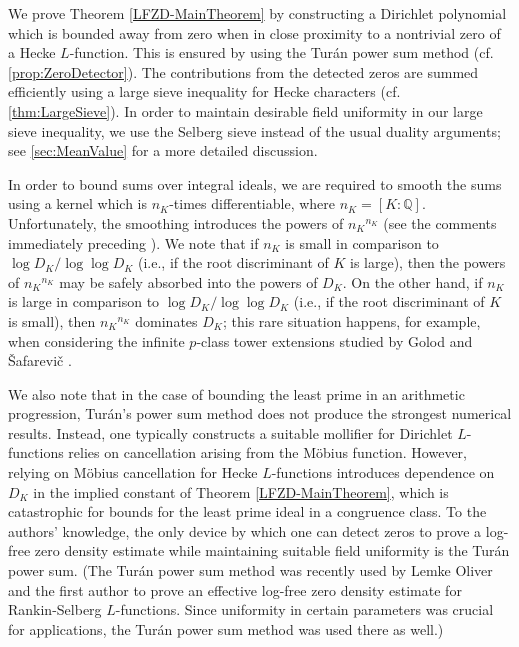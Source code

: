 \documentclass[12pt,psamsfonts]{amsart}
\theoremstyle{definition}
\theoremstyle{remark}
\numberwithin{equation}{section}
\theoremstyle{plain}
\theoremstyle{remark}
\renewcommand{\1}{ {\bf 1}}
\newcommand{\Q}{\mathbb{Q}}
\begin{document}
We prove Theorem \ref{LFZD-MainTheorem} by constructing a Dirichlet polynomial which is bounded away from zero when in close proximity to a nontrivial zero of a Hecke $L$-function.  This is ensured by using the Tur\'an power sum method (cf. \cref{prop:ZeroDetector}).  The contributions from the detected zeros are summed efficiently using a large sieve inequality for Hecke characters (cf. \cref{thm:LargeSieve}).  In order to maintain desirable field uniformity in our large sieve inequality, we use the Selberg sieve instead of the usual duality arguments; see \cref{sec:MeanValue} for a more detailed discussion.

In order to bound sums over integral ideals, we are required to smooth the sums using a kernel which is ${n_K}$-times differentiable, where $n_K=[K:\Q]$.  Unfortunately, the smoothing introduces the powers of ${n_K}^{{n_K}}$  (see the comments immediately preceding \cite[Section 1]{Weiss}).  We note that if ${n_K}$ is small in comparison to $\log D_K / \log\log D_K$ (i.e., if the root discriminant of $K$ is large), then the powers of ${n_K}^{{n_K}}$ may be safely absorbed into the powers of $D_K$.  On the other hand, if ${n_K}$ is large in comparison to $\log D_K / \log\log D_K$ (i.e., if the root discriminant of $K$ is small), then ${n_K}^{{n_K}}$ dominates $D_K$; this rare situation happens, for example, when considering the infinite $p$-class tower extensions studied by Golod and \v{S}afarevi\v{c} \cite{GS}.

We also note that in the case of bounding the least prime in an arithmetic progression, Tur\'an's power sum method does not produce the strongest numerical results.  Instead, one typically constructs a suitable mollifier for Dirichlet $L$-functions relies on cancellation arising from the M{\"o}bius function.  However, relying on M{\"o}bius cancellation for Hecke $L$-functions introduces dependence on $D_K$ in the implied constant of Theorem \ref{LFZD-MainTheorem}, which is catastrophic for bounds for the least prime ideal in a congruence class.  To the authors' knowledge, the only device by which one can detect zeros to prove a log-free zero density estimate while maintaining suitable field uniformity is the Tur\'an power sum.  (The Tur\'an power sum method was recently used by Lemke Oliver and the first author \cite{RJLO_JT} to prove an effective log-free zero density estimate for Rankin-Selberg $L$-functions.  Since uniformity in certain parameters was crucial for applications, the Tur\'an power sum method was used there as well.)
\end{document}
